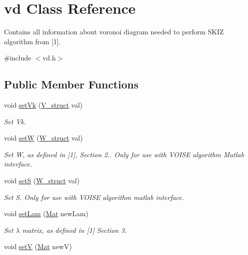\hypertarget{classvd}{}\section{vd Class Reference}
\label{classvd}


Contains all information about voronoi diagram needed to perform S\+K\+IZ algorithm from \mbox{[}1\mbox{]}.  




{\ttfamily \#include $<$vd.\+h$>$}

\subsection*{Public Member Functions}
\begin{DoxyCompactItemize}
\item 
void \mbox{\hyperlink{classvd_a062d265bd642352d6f7e8cc8685ed7a8}{set\+Vk}} (\mbox{\hyperlink{structV__struct}{V\+\_\+struct}} val)
\begin{DoxyCompactList}\small\item\em Set Vk. \end{DoxyCompactList}\item 
void \mbox{\hyperlink{classvd_a85ee3a096c181f76d15f4b7fcf137fe7}{setW}} (\mbox{\hyperlink{structW__struct}{W\+\_\+struct}} val)
\begin{DoxyCompactList}\small\item\em Set W, as defined in \mbox{[}1\mbox{]}, Section 2.. Only for use with V\+O\+I\+SE algorithm Matlab interface. \end{DoxyCompactList}\item 
void \mbox{\hyperlink{classvd_a0b4c53a592ec499899a37c2e6364806a}{setS}} (\mbox{\hyperlink{structW__struct}{W\+\_\+struct}} val)
\begin{DoxyCompactList}\small\item\em Set S. Only for use with V\+O\+I\+SE algorithm matlab interface. \end{DoxyCompactList}\item 
void \mbox{\hyperlink{classvd_ae13e9e465d08425218bd8f85ce420c05}{set\+Lam}} (\mbox{\hyperlink{typedefs_8h_a9fa28c1f74e909474857584f5c7b0088}{Mat}} new\+Lam)
\begin{DoxyCompactList}\small\item\em Set $ \lambda $ matrix, as defined in \mbox{[}1\mbox{]} Section 3. \end{DoxyCompactList}\item 
void \mbox{\hyperlink{classvd_a33e792915ebd0295a3475fe686b41ee9}{setV}} (\mbox{\hyperlink{typedefs_8h_a9fa28c1f74e909474857584f5c7b0088}{Mat}} newV)

\end{DoxyCompactItemize}
